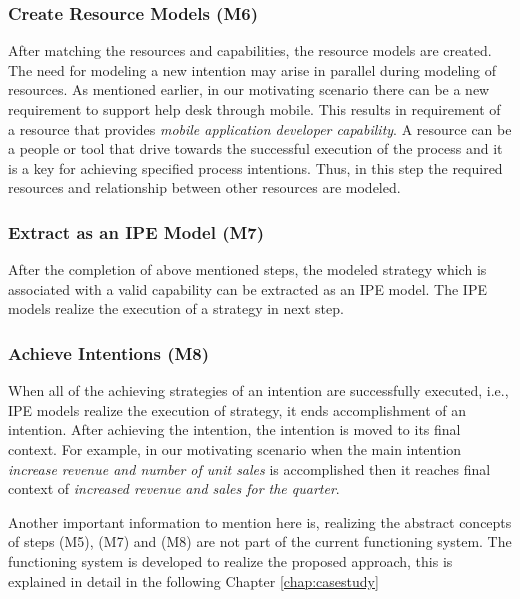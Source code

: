 \subsubsection{Create Resource Models (M6)}  
After matching the resources and capabilities, the resource models are created. The need for modeling a new intention may arise in parallel during modeling of resources. As mentioned earlier, in our motivating scenario there can be a new requirement to support help desk through mobile. This results in requirement of a resource that provides \textit{mobile application developer capability}. A resource can be a people or tool that drive towards the successful execution of the process and it is a key for achieving specified process intentions. Thus, in this step the required resources and relationship between other resources are modeled.  

\subsubsection{Extract as an IPE Model (M7)}  
After the completion of above mentioned steps, the modeled strategy which is associated with a valid capability can be extracted as an IPE model. The IPE models realize the execution of a strategy in next step. 

\subsubsection{Achieve Intentions (M8)}
When all of the achieving strategies of an intention are successfully executed, i.e., IPE models realize the execution of strategy, it ends accomplishment of an intention. After achieving the intention, the intention is moved to its final context. For example, in our motivating scenario when the main intention \textit{increase revenue and number of unit sales} is accomplished then it reaches final context of \textit{increased revenue and sales for the quarter}. 

Another important information to mention here is, realizing the abstract concepts of steps (M5), (M7) and (M8) are not part of the current functioning system. The functioning system is developed to realize the proposed approach, this is explained in detail in the following Chapter \ref{chap:casestudy}  
 

